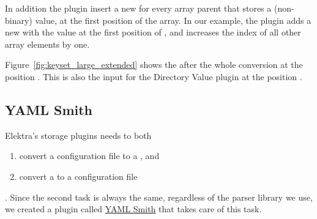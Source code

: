In addition the plugin insert a new  for every array parent that stores a (non-binary) value, at the first position of the array. In our example, the plugin adds a new  with the value  at the first position of , and increases the index of all other array elements by one.

Figure~\ref{fig:keyset_large_extended} shows the  after the whole conversion at the position . This  is also the input for the Directory Value plugin at the position .

\subsection{YAML Smith}

Elektra’s storage plugins needs to both

\begin{enumerate}
  \item convert a configuration file to a , and
  \item convert a  to a configuration file
\end{enumerate}

. Since the second task is always the same, regardless of the parser library we use, we created a plugin called \href{http://libelektra.org/plugins/yamlsmith}{YAML Smith} that takes care of this task.
